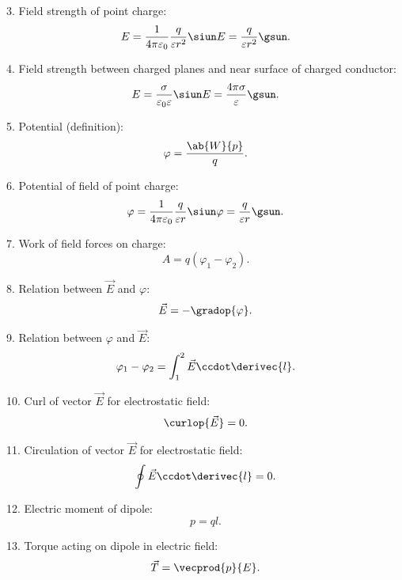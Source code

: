 3. Field strength of point charge:
\begin{equation*}
	E = \dfrac{1}{4\pi\varepsilon_0} \dfrac{q}{\varepsilon r^2} \siun E=\dfrac{q}{\varepsilon r^2} \gsun.
\end{equation*}

4. Field strength between charged planes and near surface of charged conductor:
\begin{equation*}
	E=\frac{\sigma}{\varepsilon_0\varepsilon} \siun E=\frac{4\pi\sigma}{\varepsilon} \gsun.
\end{equation*}

5. Potential (definition):
\begin{equation*}
	\varphi = \frac{\ab{W}{p}}{q}.
\end{equation*}

6. Potential of field of point charge:
\begin{equation*}
	\varphi=\frac{1}{4\pi\varepsilon_0} \frac{q}{\varepsilon r} \siun \varphi=\frac{q}{\varepsilon r} \gsun.
\end{equation*}

7. Work of field forces on charge:
\begin{equation*}
	A = q (\varphi_1 - \varphi_2).
\end{equation*}

8. Relation between $\vec{E}$ and $\varphi$:
\begin{equation*}
	\vec{E} = - \gradop{\varphi}.
\end{equation*}

9. Relation between $\varphi$ and $\vec{E}$:
\begin{equation*}
	\varphi_1 - \varphi_2 = \int_1^2 \vec{E}\ccdot\derivec{l}.
\end{equation*}

10. Curl of vector $\vec{E}$ for electrostatic field:
\begin{equation*}
	\curlop{\vec{E}} = 0.
\end{equation*}

11. Circulation of vector $\vec{E}$ for electrostatic field:
\begin{equation*}
	\oint \vec{E}\ccdot\derivec{l} = 0.
\end{equation*}

12. Electric moment of dipole:
\begin{equation*}
	p = ql.
\end{equation*}

13. Torque acting on dipole in electric field:
\begin{equation*}
	\vec{T} = \vecprod{p}{E}.
\end{equation*}

